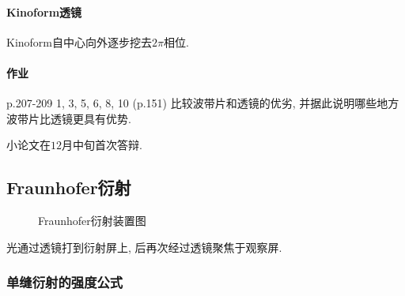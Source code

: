 \documentclass{ctexart}
\begin{document}

\paragraph{Kinoform透镜} %
\label{par:kinoform透镜}

Kinoform自中心向外逐步挖去$2\pi$相位.


\paragraph{作业} %
\label{par:作业}

p.207-209 1, 3, 5, 6, 8, 10 (p.151) 比较波带片和透镜的优劣, 并据此说明哪些地方波带片比透镜更具有优势.


\par
小论文在$12$月中旬首次答辩.


\subsection{Fraunhofer衍射} %
\label{sub:fraunhofer衍射}

\begin{figure}[ht]
    \centering
    \caption{Fraunhofer衍射装置图}
\end{figure}
光通过透镜打到衍射屏上, 后再次经过透镜聚焦于观察屏. 

\subsubsection{单缝衍射的强度公式} %
\label{ssub:单缝衍射的强度公式}
\end{document}
